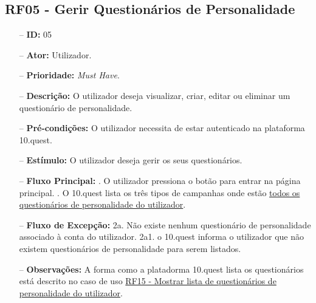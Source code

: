 \begin{comment}

\subsection{RF04 - Lista de utilizadores}
\begin{itemize}
	\item[--] \textbf{ID:} 04
	\item[--]  \textbf{Ator:} 
	\item[--]  \textbf{Prioridade:}
	\item[--]  \textbf{Descrição:} 
	\item[--]  \textbf{Pré-condições:} 
	\item[--]  \textbf{Estimulo:}
	\item[--]  \textbf{Fluxo Principal:} 
		\subitem
		\subitem
		\subitem
		\subitem
	\item[--]  \textbf{Fluxo de Excepção:} 
		\subitem
		\subitem
		\subitem
		\subitem
	\item[--]  \textbf{Observações:} 
\end{itemize}
\newpage
\end{comment}

\subsection{RF05 - Gerir Questionários de Personalidade}
\begin{itemize}
	\item[--] \textbf{ID:} 05
	\item[--]  \textbf{Ator:} Utilizador.
	\item[--]  \textbf{Prioridade:} \textit{Must Have}.
	\item[--]  \textbf{Descrição:} O utilizador deseja visualizar, criar, editar ou eliminar um questionário de personalidade.
	\item[--]  \textbf{Pré-condições:} O utilizador necessita de estar autenticado na plataforma 10.quest.
	\item[--]  \textbf{Estímulo:} O utilizador deseja gerir os seus questionários.
	\item[--]  \textbf{Fluxo Principal:} 
		. O utilizador pressiona o botão para entrar na página principal.
		. O 10.quest lista os três tipos de campanhas onde estão  \underline{ todos os questionários de personalidade do utilizador}.
	\item[--]  \textbf{Fluxo de Excepção:} 
		\subitem 2a. Não existe nenhum questionário de personalidade associado à conta do utilizador.
		\subitem 2a1. o 10.quest informa o utilizador que não existem questionários de personalidade para serem listados.
	\item[--]  \textbf{Observações:} A forma como a platadorma 10.quest lista os questionários está descrito no caso de uso \underline{RF15 - Mostrar lista de questionários de personalidade do utilizador}.
\end{itemize}
\newpage

